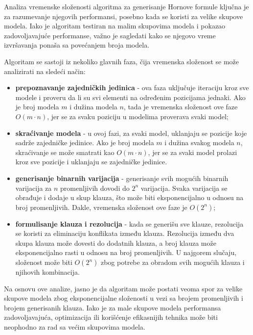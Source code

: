 \documentclass[12pt,oneside]{memoir}
\begin{document}
Analiza vremenske složenosti algoritma za generisanje Hornove formule ključna je za razumevanje njegovih performansi, posebno kada se koristi za velike skupove modela. Iako je algoritam testiran na malim skupovima modela i pokazao zadovoljavajuće performanse, važno je sagledati kako se njegovo vreme izvršavanja ponaša sa povećanjem broja modela.

Algoritam se sastoji iz nekoliko glavnih faza, čija vremenska složenost se može analizirati na sledeći način:

\begin{itemize}
    \item \textbf{prepoznavanje zajedničkih jedinica} - ova faza uključuje iteraciju kroz sve modele i proveru da li su svi elementi na određenim pozicijama jednaki. Ako je broj modela \( m \) i dužina modela \( n \), tada je vremenska složenost ove faze \( O(m \cdot n) \), jer se za svaku poziciju u modelima proverava svaki model;
    
    \item \textbf{skraćivanje modela} - u ovoj fazi, za svaki model, uklanjaju se pozicije koje sadrže zajedničke jedinice. Ako je broj modela \( m \) i dužina svakog modela \( n \), skraćivanje se može smatrati kao \( O(m \cdot n) \), jer se za svaki model prolazi kroz sve pozicije i uklanjaju se zajedničke jedinice.
    
    \item \textbf{generisanje binarnih varijacija} - generisanje svih mogućih binarnih varijacija za \( n \) promenljivih dovodi do \( 2^n \) varijacija. Svaka varijacija se obrađuje i dodaje u skup klauza, što može biti eksponencijalno u odnosu na broj promenljivih. Dakle, vremenska složenost ove faze je \( O(2^n) \);
    
    \item \textbf{formulisanje klauza i rezolucija} - kada se generišu sve klauze, rezolucija se koristi za eliminaciju konflikata između klauza. Rezolucija između dva skupa klauza može dovesti do dodatnih klauza, a broj klauza može eksponencijalno rasti u odnosu na broj promenljivih. U najgorem slučaju, složenost može biti \( O(2^n) \) zbog potrebe za obradom svih mogućih klauza i njihovih kombinacija.
\end{itemize}

Na osnovu ove analize, jasno je da algoritam može postati veoma spor za velike skupove modela zbog eksponencijalne složenosti u vezi sa brojem promenljivih i brojem generisanih klauza. Iako je za male skupove modela performansa zadovoljavajuća, optimizacija ili korišćenje efikasnijih tehnika može biti neophodno za rad sa većim skupovima modela.
\end{document}
